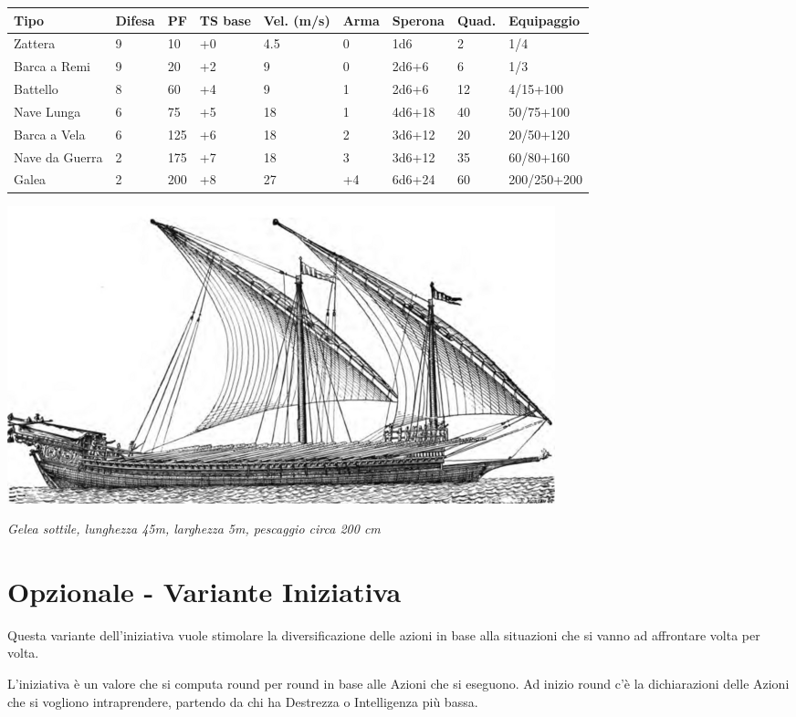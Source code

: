 \documentclass[a4paper,twoside,openany]{book}
\begin{document}
\begin{tabular}{lllllllll}
\textbf{Tipo}  & \textbf{Difesa} & \textbf{PF} & \textbf{TS base} & \textbf{Vel. (m/s)} & \textbf{Arma} & \textbf{Sperona} & \textbf{Quad}. & \textbf{Equipaggio}\\
\toprule
Zattera & 9 & 10& +0& 4.5  & 0 & 1d6  & 2  & 1/4\\
Barca a Remi & 9& 20& +2& 9  & 0 & 2d6+6  & 6  & 1/3\\
Battello  & 8& 60& +4& 9  & 1 & 2d6+6  & 12  & 4/15+100\\
Nave Lunga& 6& 75& +5& 18 & 1 & 4d6+18 & 40  & 50/75+100\\
Barca a Vela & 6& 125  & +6& 18 & 2 & 3d6+12 & 20  & 20/50+120\\
Nave da Guerra & 2& 175  & +7& 18 & 3 & 3d6+12 & 35  & 60/80+160\\
Galea& 2& 200  & +8& 27 & +4  & 6d6+24 & 60  & 200/250+200\\
\end{tabular}

\vfill

\begin{center}
\includegraphics[width=0.6\linewidth]{immagini/Galley_running_before_the_wind.png}

\smallskip

\emph{Gelea sottile, lunghezza 45m, larghezza 5m, pescaggio circa 200 cm}

\end{center}

\pagebreak


\section{Opzionale - Variante Iniziativa}\hypertarget{varianteiniziativa}{}\label{varianteiniziativa}

Questa variante dell'iniziativa vuole stimolare la diversificazione delle azioni in base alla situazioni che si vanno ad affrontare volta per volta.

L'iniziativa è un valore che si computa round per round in base alle Azioni che si eseguono. Ad inizio round c'è la dichiarazioni delle Azioni che si vogliono intraprendere, partendo da chi ha Destrezza o Intelligenza più bassa.
\end{document}
